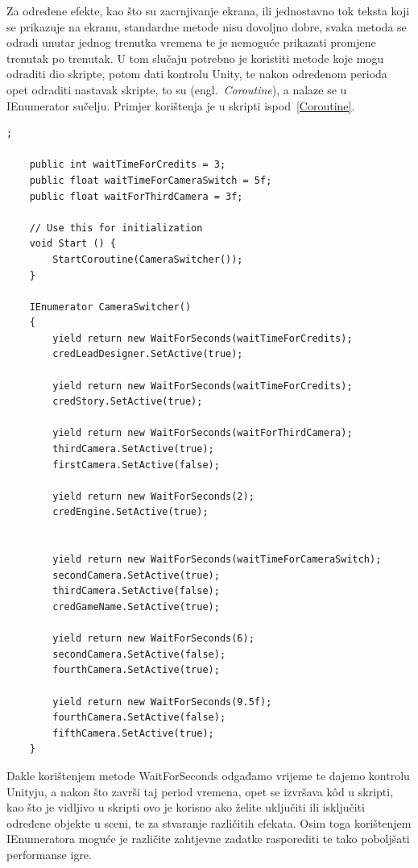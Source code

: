 Za određene efekte, kao što su zacrnjivanje ekrana, ili jednostavno tok teksta koji se prikazuje na ekranu, standardne metode nisu dovoljno dobre, svaka metoda se odradi unutar jednog trenutka vremena te je nemoguće prikazati promjene trenutak po trenutak. U tom slučaju potrebno je koristiti metode koje mogu odraditi dio skripte, potom dati kontrolu Unity, te nakon određenom perioda opet odraditi nastavak skripte, to su (engl.~\textit{Coroutine}), a nalaze se u IEnumerator sučelju. Primjer korištenja je u skripti ispod~\ref{Coroutine}.
\begin{lstlisting}[caption={Upravljanje vremenom}, label=Coroutine];

    public int waitTimeForCredits = 3;
    public float waitTimeForCameraSwitch = 5f;
    public float waitForThirdCamera = 3f;

	// Use this for initialization
	void Start () {
        StartCoroutine(CameraSwitcher());
	}

    IEnumerator CameraSwitcher()
    {
        yield return new WaitForSeconds(waitTimeForCredits);
        credLeadDesigner.SetActive(true);

        yield return new WaitForSeconds(waitTimeForCredits);
        credStory.SetActive(true);

        yield return new WaitForSeconds(waitForThirdCamera);
        thirdCamera.SetActive(true);
        firstCamera.SetActive(false);

        yield return new WaitForSeconds(2);
        credEngine.SetActive(true);


        yield return new WaitForSeconds(waitTimeForCameraSwitch);
        secondCamera.SetActive(true);
        thirdCamera.SetActive(false);
        credGameName.SetActive(true);

        yield return new WaitForSeconds(6);
        secondCamera.SetActive(false);
        fourthCamera.SetActive(true);

        yield return new WaitForSeconds(9.5f);
        fourthCamera.SetActive(false);
        fifthCamera.SetActive(true);
    }
\end{lstlisting}

Dakle korištenjem metode WaitForSeconds odgađamo vrijeme te dajemo kontrolu Unityju, a nakon što završi taj period vremena, opet se izvršava k\^od u skripti, kao što je vidljivo u skripti ovo je korisno ako želite uključiti ili isključiti određene objekte u sceni, te za stvaranje različitih efekata. Osim toga korištenjem IEnumeratora moguće je različite zahtjevne zadatke rasporediti te tako poboljšati performanse igre.

